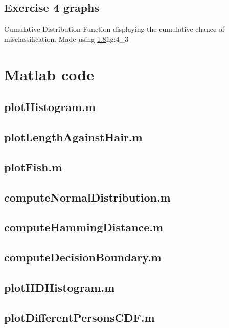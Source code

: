 \documentclass[10pt,a4paper]{article}
\begin{document}
\subsection{Exercise 4 graphs}


{Cumulative Distribution Function displaying the cumulative chance of misclassification. Made using \ref{a:plotCDF}}{fig:4_3}

\section{Matlab code}
\subsection{plotHistogram.m}\label{a:plotHistogram}

\subsection{plotLengthAgainstHair.m}\label{a:plotLengthAgainstHair}

\subsection{plotFish.m}\label{a:plotFish}

\subsection{computeNormalDistribution.m}\label{a:computeND}

\subsection{computeHammingDistance.m}\label{a:computeHD}

\subsection{computeDecisionBoundary.m}\label{a:computeDB}

\subsection{plotHDHistogram.m}\label{a:plotHDHistogram}

\subsection{plotDifferentPersonsCDF.m}\label{a:plotCDF}
\end{document}
